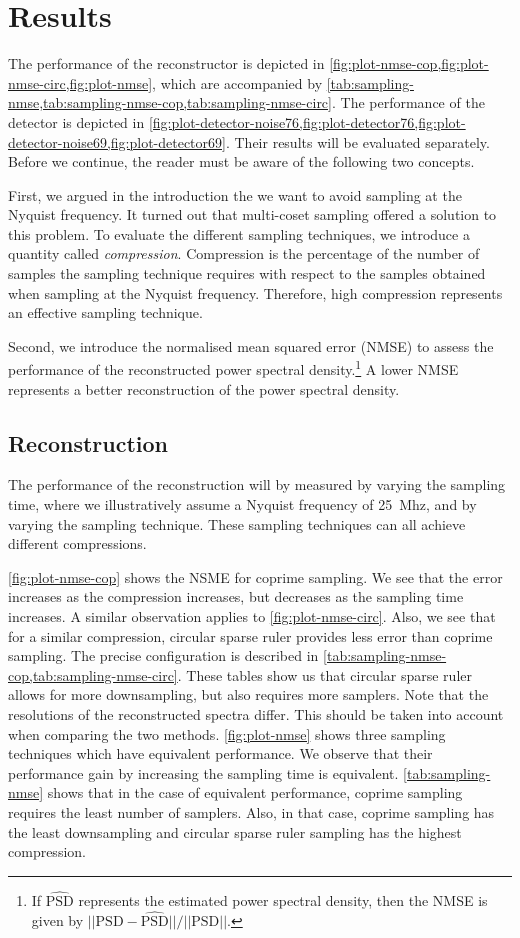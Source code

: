 \documentclass[a4paper, openany, oneside]{memoir}
\begin{document}
\section{Results}\label{sec:results_theory}
The performance of the reconstructor is depicted in \cref{fig:plot-nmse-cop,fig:plot-nmse-circ,fig:plot-nmse}, which are accompanied by \cref{tab:sampling-nmse,tab:sampling-nmse-cop,tab:sampling-nmse-circ}. The performance of the detector is depicted in \cref{fig:plot-detector-noise76,fig:plot-detector76,fig:plot-detector-noise69,fig:plot-detector69}. Their results will be evaluated separately. Before we continue, the reader must be aware of the following two concepts.

First, we argued in the introduction the we want to avoid sampling at the Nyquist frequency. It turned out that multi-coset sampling offered a solution to this problem. To evaluate the different sampling techniques, we introduce a quantity called \textit{compression}. Compression is the percentage of the number of samples the sampling technique requires with respect to the samples obtained when sampling at the Nyquist frequency. Therefore, high compression represents an effective sampling technique.

Second, we introduce the normalised mean squared error (NMSE) to assess the performance of the reconstructed power spectral density.\footnote{If $\hat{\text{PSD}}$ represents the estimated power spectral density, then the NMSE is given by $||\text{PSD} - \hat{\text{PSD}}||/||\text{PSD}||$.} A lower NMSE represents a better reconstruction of the power spectral density.

\subsection{Reconstruction}
The performance of the reconstruction will by measured by varying the sampling time, where we illustratively assume a Nyquist frequency of \SI{25}{Mhz}, and by varying the sampling technique. These sampling techniques can all achieve different compressions.

\cref{fig:plot-nmse-cop} shows the NSME for coprime sampling. We see that the error increases as the compression increases, but decreases as the sampling time increases. A similar observation applies to \cref{fig:plot-nmse-circ}. Also, we see that for a similar compression, circular sparse ruler provides less error than coprime sampling. The precise configuration is described in \cref{tab:sampling-nmse-cop,tab:sampling-nmse-circ}. These tables show us that circular sparse ruler allows for more downsampling, but also requires more samplers. Note that the resolutions of the reconstructed spectra differ. This should be taken into account when comparing the two methods. \cref{fig:plot-nmse} shows three sampling techniques which have equivalent performance. We observe that their performance gain by increasing the sampling time is equivalent. \cref{tab:sampling-nmse} shows that in the case of equivalent performance, coprime sampling requires the least number of samplers. Also, in that case, coprime sampling has the least downsampling and circular sparse ruler sampling has the highest compression.
\end{document}
